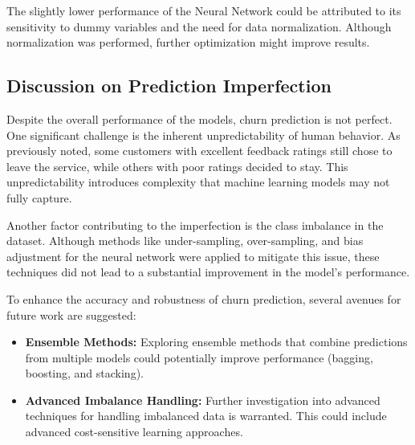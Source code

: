 \documentclass[12pt]{article}
\begin{document}
The slightly lower performance of the Neural Network could be attributed to its sensitivity to dummy variables and the need for data normalization. Although normalization was performed, further optimization might improve results.

\subsection{Discussion on Prediction Imperfection}

Despite the overall performance of the models, churn prediction is not perfect. One significant challenge is the inherent unpredictability of human behavior. As previously noted, some customers with excellent feedback ratings still chose to leave the service, while others with poor ratings decided to stay. This unpredictability introduces complexity that machine learning models may not fully capture.

Another factor contributing to the imperfection is the class imbalance in the dataset. Although methods like under-sampling, over-sampling, and bias adjustment for the neural network were applied to mitigate this issue, these techniques did not lead to a substantial improvement in the model's performance. 

To enhance the accuracy and robustness of churn prediction, several avenues for future work are suggested:
\begin{itemize}
    \item \textbf{Ensemble Methods:} Exploring ensemble methods that combine predictions from multiple models could potentially improve performance (bagging, boosting, and stacking).
    \item \textbf{Advanced Imbalance Handling:} Further investigation into advanced techniques for handling imbalanced data is warranted. This could include advanced cost-sensitive learning approaches.
\end{itemize}
\end{document}

